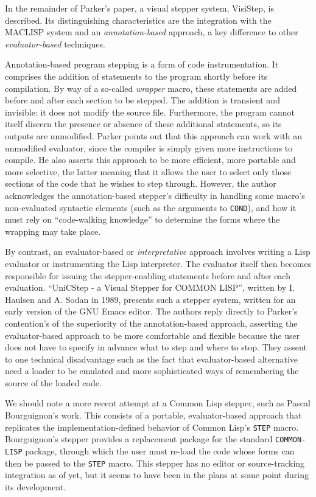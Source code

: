 \documentclass[sigconf]{acmart}
\begin{document}
In the remainder of Parker's paper\cite{annotation-based}, a
visual stepper system, VisiStep, is described.  Its distinguishing
characteristics are the integration with the MACLISP system and an
\emph{annotation-based} approach, a key difference to other
\emph{evaluator-based} techniques.

Annotation-based program stepping is a form of code instrumentation.
It comprises the addition of statements to the program shortly before
its compilation.  By way of a so-called \emph{wrapper} macro, these
statements are added before and after each section to be stepped.  The
addition is transient and invisible: it does not modify the source
file.  Furthermore, the program cannot itself discern the presence or
absence of these additional statements, so its outputs are unmodified.
Parker\cite{annotation-based} points out that this approach can work
with an unmodified evaluator, since the compiler is simply given more
instructions to compile.  He also asserts this approach to be more
efficient, more portable and more selective, the latter meaning that
it allows the user to select only those sections of the code that he
wishes to step through.  However, the author acknowledges the
annotation-based stepper's difficulty in handling some macro's
non-evaluated syntactic elements (such as the arguments to
\texttt{COND}), and how it must rely on ``code-walking
knowledge''\cite[I-4.8]{annotation-based} to determine the forms where
the wrapping may take place.

By contrast, an evaluator-based or \emph{interpretative} approach
involves writing a Lisp evaluator or instrumenting the Lisp
interpreter. The evaluator itself then becomes responsible for issuing
the stepper-enabling statements before and after each evaluation.
``UniCStep - a Visual Stepper for COMMON LISP'', written by I. Haulsen
and A. Sodan in 1989\cite{evaluation-based}, presents such a stepper
system, written for an early version of the GNU Emacs editor. The
authors reply directly to Parker's contention's of the superiority of
the annotation-based approach, asserting the evaluator-based approach
to be more comfortable and flexible because the user does not have to
specify in advance what to step and where to stop.  They assent to one
technical disadvantage such as the fact that evaluator-based
alternative need a loader to be emulated and more sophisticated ways
of remembering the source of the loaded code.

We should note a more recent attempt at a Common Lisp stepper, such as
Pascal Bourguignon's work\cite{bourguignon}.  This consists of a
portable, evaluator-based approach that replicates the
implementation-defined behavior of Common Lisp's \texttt{STEP} macro.
Bourguignon's stepper provides a replacement package for the standard
\texttt{COMMON-LISP} package, through which the user must re-load the
code whose forms can then be passed to the \texttt{STEP} macro.  This
stepper has no editor or source-tracking integration as of yet, but it
seems to have been in the plans at some point during its development.
\end{document}
